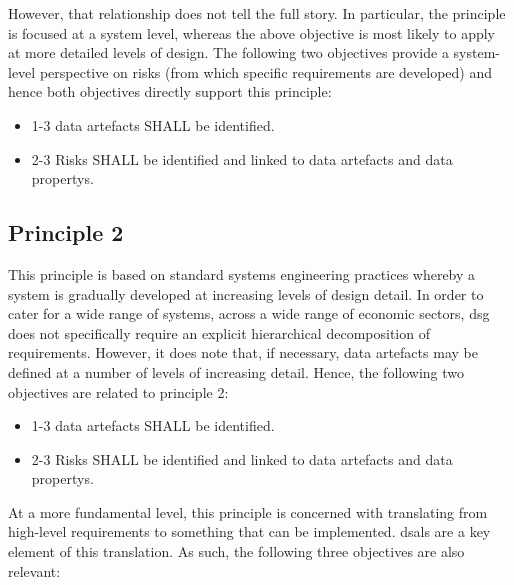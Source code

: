 However, that relationship does not tell the full story. In particular, the principle is focused at a system level, whereas the above objective is most likely to apply at more detailed levels of design. The following two objectives provide a system-level perspective on risks (from which specific requirements are developed) and hence both objectives directly support this principle:

\begin{itemize}
	\item \textcolor{dsiwgAccentColour}{1-3} \Glspl{data artefact} SHALL be identified.
	\item \textcolor{dsiwgAccentColour}{2-3} Risks SHALL be identified and linked to \glspl{data artefact} and \glspl{data property}.
\end{itemize}


\subsection{Principle 2}

This principle is based on standard systems engineering practices whereby a system is gradually developed at increasing levels of design detail. In order to cater for a wide range of systems, across a wide range of economic sectors, \gls{dsg} does not specifically require an explicit hierarchical decomposition of requirements. However, it does note that, if necessary, \glspl{data artefact} may be defined at a number of levels of increasing detail. Hence, the following two objectives are related to principle 2:

\begin{itemize}
	\item \textcolor{dsiwgAccentColour}{1-3} \Glspl{data artefact} SHALL be identified.
	\item \textcolor{dsiwgAccentColour}{2-3} Risks SHALL be identified and linked to \glspl{data artefact} and \glspl{data property}.
\end{itemize}

At a more fundamental level, this principle is concerned with translating from high-level requirements to something that can be implemented. \Glspl{dsal} are a key element of this translation. As such, the following three objectives are also relevant:

